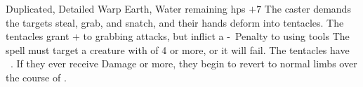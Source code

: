   {Duplicated, Detailed}%
  {Warp}%
  {Earth, Water}%
  {remaining \glspl{hp} $+7$}%
  {The caster demands the targets steal, grab, and snatch, and their hands deform into  tentacles.
  The tentacles grant + to grabbing attacks, but inflict a -~Penalty to using tools}%
  {
  The spell must target a creature with  of 4 or more, or it will fail.
  The tentacles have ~.
  If they ever receive  Damage or more, they begin to revert to normal limbs over the course of .}
